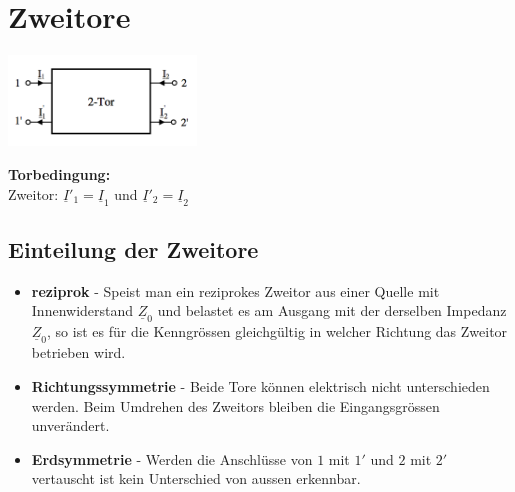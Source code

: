 \section{Zweitore}
	\begin{minipage}{5.5cm}
		\includegraphics[width = 5cm]{./bilder/zweitor}
	\end{minipage}
	\begin{minipage}{8cm}
		\textbf{Torbedingung:}\\
		Zweitor: $\underline{I}'_1 = \underline{I}_1$ und $\underline{I}'_2 = \underline{I}_2$
		
	\end{minipage}

\subsection{Einteilung der Zweitore}
	\begin{itemize}
	 \item \textbf{reziprok} - Speist man ein reziprokes Zweitor aus einer Quelle mit Innenwiderstand $\underline{Z}_0$ und belastet es am Ausgang mit der derselben Impedanz $\underline{Z}_0$, so ist es für die Kenngrössen gleichgültig in welcher Richtung das Zweitor betrieben wird.
	 \item \textbf{Richtungssymmetrie} - Beide Tore können elektrisch nicht unterschieden werden. Beim Umdrehen des Zweitors bleiben die Eingangsgrössen unverändert.
	 \item \textbf{Erdsymmetrie} - Werden die Anschlüsse von $1$ mit $1'$ und $2$ mit $2'$ vertauscht ist kein Unterschied von aussen erkennbar.
	\end{itemize}

